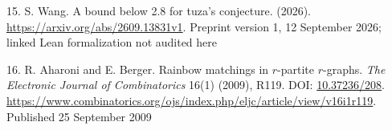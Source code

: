 \documentclass[11pt]{article}
\newenvironment{CSLReferences}[2]{\par\setlength{\parindent}{0pt}\setlength{\parskip}{6pt}}{}
\begin{document}
\begin{CSLReferences}{0}{1}
\par{}\label{ref-Wang2026}
15. S. Wang. A bound below 2.8 for tuza's conjecture. (2026). \url{https://arxiv.org/abs/2609.13831v1}. Preprint version 1, 12 September 2026; linked Lean formalization not audited here

\par{}\label{ref-AharoniBerger2009}
16. R. Aharoni and E. Berger. Rainbow matchings in {\(r\)}-partite {\(r\)}-graphs. \emph{The Electronic Journal of Combinatorics} 16(1) (2009), R119. DOI: \href{https://doi.org/10.37236/208}{10.37236/208}. \url{https://www.combinatorics.org/ojs/index.php/eljc/article/view/v16i1r119}. Published 25 September 2009

\end{CSLReferences}
\end{document}
